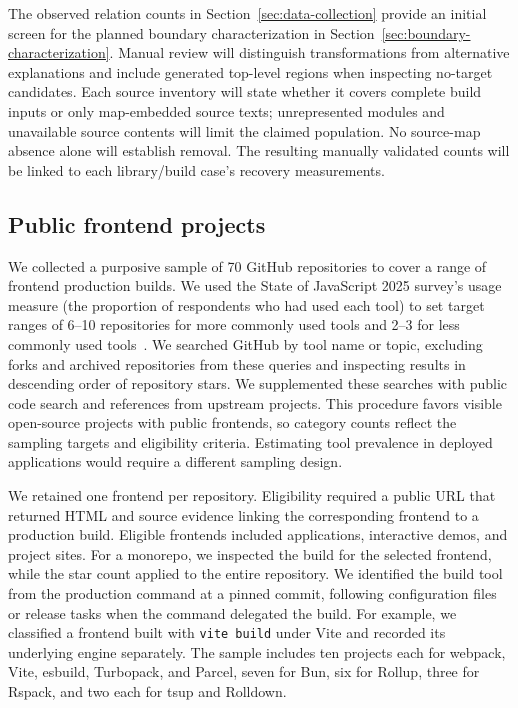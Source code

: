 The observed relation counts in Section~\ref{sec:data-collection} provide an initial screen for the planned boundary characterization in Section~\ref{sec:boundary-characterization}. Manual review will distinguish transformations from alternative explanations and include generated top-level regions when inspecting no-target candidates. Each source inventory will state whether it covers complete build inputs or only map-embedded source texts; unrepresented modules and unavailable source contents will limit the claimed population. No source-map absence alone will establish removal. The resulting manually validated counts will be linked to each library/build case's recovery measurements.

\subsection{Public frontend projects}
\label{sec:planned-websites}
We collected a purposive sample of 70 GitHub repositories to cover a range of frontend production builds. We used the State of JavaScript 2025 survey's usage measure (the proportion of respondents who had used each tool) to set target ranges of 6--10 repositories for more commonly used tools and 2--3 for less commonly used tools~\cite{stateofjs2025}. We searched GitHub by tool name or topic, excluding forks and archived repositories from these queries and inspecting results in descending order of repository stars. We supplemented these searches with public code search and references from upstream projects. This procedure favors visible open-source projects with public frontends, so category counts reflect the sampling targets and eligibility criteria. Estimating tool prevalence in deployed applications would require a different sampling design.

We retained one frontend per repository. Eligibility required a public URL that returned HTML and source evidence linking the corresponding frontend to a production build. Eligible frontends included applications, interactive demos, and project sites. For a monorepo, we inspected the build for the selected frontend, while the star count applied to the entire repository. We identified the build tool from the production command at a pinned commit, following configuration files or release tasks when the command delegated the build. For example, we classified a frontend built with \texttt{vite build} under Vite and recorded its underlying engine separately. The sample includes ten projects each for webpack, Vite, esbuild, Turbopack, and Parcel, seven for Bun, six for Rollup, three for Rspack, and two each for tsup and Rolldown.

